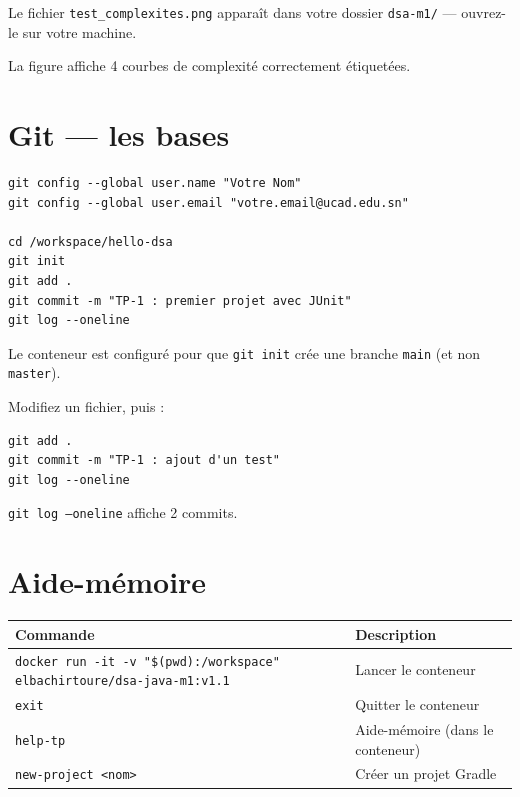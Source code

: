 \documentclass[11pt,a4paper]{article}
\begin{document}
Le fichier \texttt{test\_complexites.png} apparaît dans votre dossier \texttt{dsa-m1/} --- ouvrez-le sur votre machine.

\begin{exercicebox}[Vérification 6]
La figure affiche 4 courbes de complexité correctement étiquetées.
\end{exercicebox}

\section{Git --- les bases}

\begin{lstlisting}[style=bash]
git config --global user.name "Votre Nom"
git config --global user.email "votre.email@ucad.edu.sn"

cd /workspace/hello-dsa
git init
git add .
git commit -m "TP-1 : premier projet avec JUnit"
git log --oneline
\end{lstlisting}

\begin{infobox}
Le conteneur est configuré pour que \texttt{git init} crée une branche \texttt{main} (et non \texttt{master}).
\end{infobox}

Modifiez un fichier, puis :

\begin{lstlisting}[style=bash]
git add .
git commit -m "TP-1 : ajout d'un test"
git log --oneline
\end{lstlisting}

\begin{exercicebox}[Vérification 7]
\texttt{git log --oneline} affiche 2 commits.
\end{exercicebox}

\section{Aide-mémoire}

\begin{retenirbox}
\renewcommand{\arraystretch}{1.3}
\small
\begin{tabular}{@{}p{8.5cm} p{5cm}@{}}
\toprule
\textbf{Commande} & \textbf{Description} \\
\midrule
\texttt{docker run -it -v "\$(pwd):/workspace" elbachirtoure/dsa-java-m1:v1.1} & Lancer le conteneur \\
\texttt{exit} & Quitter le conteneur \\
\texttt{help-tp} & Aide-mémoire (dans le conteneur) \\
\texttt{new-project <nom>} & Créer un projet Gradle \\
\bottomrule
\end{tabular}
\end{retenirbox}
\end{document}
